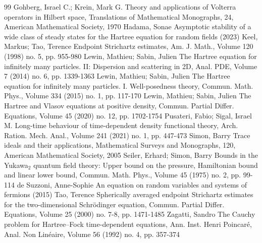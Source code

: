 \begin{thebibliography}{99}
 Gohberg, Israel C.; Krein, Mark G. Theory and applications of Volterra operators in Hilbert space, Translations of Mathematical Monographs, 24, American Mathematical Society, 1970
 Hadama, Sonae Asymptotic stability of a wide class of steady states for the Hartree equation for random fields (2023)
 Keel, Markus; Tao, Terence Endpoint Strichartz estimates, Am. J. Math., Volume 120 (1998) no. 5, pp. 955-980
 Lewin, Mathieu; Sabin, Julien The Hartree equation for infinitely many particles. II: Dispersion and scattering in 2D, Anal. PDE, Volume 7 (2014) no. 6, pp. 1339-1363
 Lewin, Mathieu; Sabin, Julien The Hartree equation for infinitely many particles. I. Well-posedness theory, Commun. Math. Phys., Volume 334 (2015) no. 1, pp. 117-170
 Lewin, Mathieu; Sabin, Julien The Hartree and Vlasov equations at positive density, Commun. Partial Differ. Equations, Volume 45 (2020) no. 12, pp. 1702-1754
 Pusateri, Fabio; Sigal, Israel M. Long-time behaviour of time-dependent density functional theory, Arch. Ration. Mech. Anal., Volume 241 (2021) no. 1, pp. 447-473
 Simon, Barry Trace ideals and their applications, Mathematical Surveys and Monographs, 120, American Mathematical Society, 2005
 Seiler, Erhard; Simon, Barry Bounds in the Yukawa$_2$ quantum field theory: Upper bound on the pressure, Hamiltonian bound and linear lower bound, Commun. Math. Phys., Volume 45 (1975) no. 2, pp. 99-114
 de Suzzoni, Anne-Sophie An equation on random variables and systems of fermions (2015)
 Tao, Terence Spherically averaged endpoint Strichartz estimates for the two-dimensional Schrödinger equation, Commun. Partial Differ. Equations, Volume 25 (2000) no. 7-8, pp. 1471-1485
 Zagatti, Sandro The Cauchy problem for Hartree–Fock time-dependent equations, Ann. Inst. Henri Poincaré, Anal. Non Linéaire, Volume 56 (1992) no. 4, pp. 357-374
\end{thebibliography}

